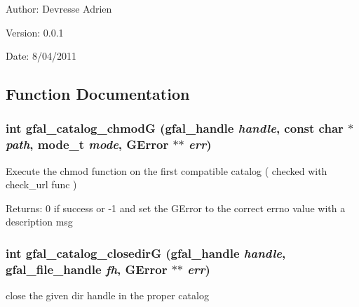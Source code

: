 \begin{Desc}
\item[Author:]Devresse Adrien \end{Desc}
\begin{Desc}
\item[Version:]0.0.1 \end{Desc}
\begin{Desc}
\item[Date:]8/04/2011 \end{Desc}


\subsection{Function Documentation}
\subsubsection{\setlength{\rightskip}{0pt plus 5cm}int gfal\_\-catalog\_\-chmod\-G (gfal\_\-handle {\em handle}, const char $\ast$ {\em path}, mode\_\-t {\em mode}, GError $\ast$$\ast$ {\em err})}\label{gfal__common__catalog_8c_12b613d1db9c17e70e679ef7285f6a6f}


Execute the chmod function on the first compatible catalog ( checked with check\_\-url func ) \begin{Desc}
\item[Returns:]0 if success or -1 and set the GError to the correct errno value with a description msg \end{Desc}
\subsubsection{\setlength{\rightskip}{0pt plus 5cm}int gfal\_\-catalog\_\-closedir\-G (gfal\_\-handle {\em handle}, gfal\_\-file\_\-handle {\em fh}, GError $\ast$$\ast$ {\em err})}\label{gfal__common__catalog_8c_348fe15690faed2e2731d15eb6cc7856}


close the given dir handle in the proper catalog 
